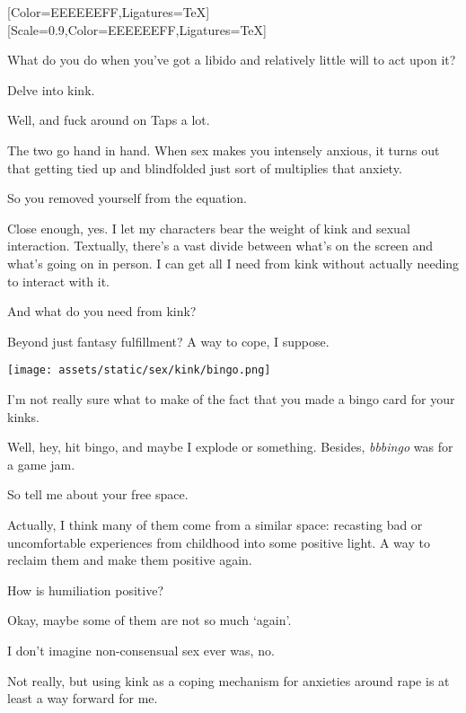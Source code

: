 \label{sex:kink}
[Color=EEEEEEFF,Ligatures=TeX]
\renewfontfamily{}[Scale=0.9,Color=EEEEEEFF,Ligatures=TeX]

\noindent What do you do when you've got a libido and relatively little will to act upon it?

Delve into kink.

\begin{ally}
Well, and fuck around on Taps a lot.
\end{ally}
The two go hand in hand. When sex makes you intensely anxious, it turns out that getting tied up and blindfolded just sort of multiplies that anxiety.

\begin{ally}
So you removed yourself from the equation.
\end{ally}
Close enough, yes. I let my characters bear the weight of kink and sexual interaction. Textually, there's a vast divide between what's on the screen and what's going on in person. I can get all I need from kink without actually needing to interact with it.

\begin{ally}
And what do you need from kink?
\end{ally}
Beyond just fantasy fulfillment? A way to cope, I suppose.

\noindent\texttt{[image: assets/static/sex/kink/bingo.png]}

\begin{ally}
I'm not really sure what to make of the fact that you made a bingo card for your kinks.
\end{ally}
Well, hey, hit bingo, and maybe I explode or something. Besides, \emph{bbbingo} was for a game jam.

\begin{ally}
So tell me about your free space.
\end{ally}
Actually, I think many of them come from a similar space: recasting bad or uncomfortable experiences from childhood into some positive light. A way to reclaim them and make them positive again.

\begin{ally}
How is humiliation positive?
\end{ally}
Okay, maybe some of them are not so much `again'.

\begin{ally}
I don't imagine non-consensual sex ever was, no.
\end{ally}
Not really, but using kink as a coping mechanism for anxieties around rape is at least a way forward for me.

